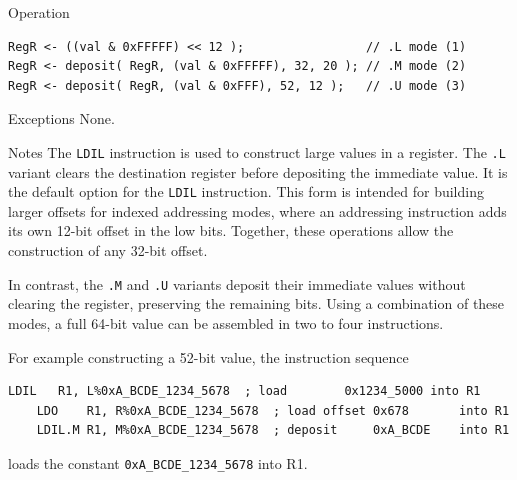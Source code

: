 \begin{iPageDescOpEntry}{Operation}
\begin{lstlisting}[style=iPageOpStyle]
RegR <- ((val & 0xFFFFF) << 12 );                 // .L mode (1)
RegR <- deposit( RegR, (val & 0xFFFFF), 32, 20 ); // .M mode (2)
RegR <- deposit( RegR, (val & 0xFFF), 52, 12 );   // .U mode (3)
\end{lstlisting}
\end{iPageDescOpEntry}

\begin{iPageDescEntry}{Exceptions}
None.
\end{iPageDescEntry}

\begin{iPageDescEntry}{Notes}
The \texttt{LDIL} instruction is used to construct large values in a register. The \texttt{.L} variant clears the destination register before depositing the immediate value.  It is the default option for the \texttt{LDIL} instruction. This form is intended for building larger offsets for indexed addressing modes, where an addressing instruction adds its own 12-bit offset in the low bits. Together, these operations allow the construction of any 32-bit offset.

In contrast, the \texttt{.M} and \texttt{.U} variants deposit their immediate values without clearing the register, preserving the remaining bits. Using a combination of these modes, a full 64-bit value can be assembled in two to four instructions.

For example constructing a 52-bit value, the instruction sequence \\

\begin{lstlisting}[style=iPageOpStyle]
    LDIL   R1, L%0xA_BCDE_1234_5678  ; load        0x1234_5000 into R1
    LDO    R1, R%0xA_BCDE_1234_5678  ; load offset 0x678       into R1
    LDIL.M R1, M%0xA_BCDE_1234_5678  ; deposit     0xA_BCDE    into R1 
\end{lstlisting}

loads the constant \texttt{0xA\_BCDE\_1234\_5678} into R1.

\end{iPageDescEntry}